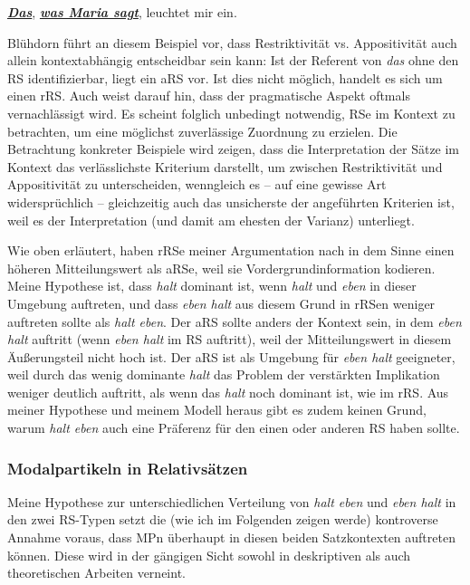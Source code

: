 \begin{exe}
	\ex\label{731} 
	\ul{\textit{\textbf{Das}}}, \ul{\textbf{\textit{was Maria sagt}}}, leuchtet mir ein.
	\hfill\hbox{\citet[27]{Bluehdorn2007}}
\end{exe}										           
Blühdorn führt an diesem Beispiel vor, dass Restriktivität vs. Appositivität auch allein kontextabhängig entscheidbar sein kann: Ist der Referent von \textit{das} ohne den RS identifizierbar, liegt ein aRS vor. Ist dies nicht möglich, handelt es sich um einen rRS. Auch \citet[193--194]{Schaffranietz1997} weist darauf hin, dass der pragmatische Aspekt oftmals vernachlässigt wird. Es scheint folglich unbedingt notwen\-dig, RSe im Kontext zu betrachten, um eine möglichst zuverlässige Zuordnung zu erzielen. Die Betrachtung konkreter Beispiele wird zeigen, dass die Interpretation der Sätze im Kontext das verlässlichste Kriterium darstellt, um zwischen Restriktivität und Appositivität zu unterscheiden, wenngleich es – auf eine gewisse Art widersprüchlich – gleichzeitig auch das unsicherste der angeführten Kriterien ist, weil es der Interpretation (und damit am ehesten der Varianz) unterliegt.

Wie oben erläutert, haben rRSe meiner Argumentation nach in dem Sinne einen höheren Mitteilungswert als aRSe, weil sie Vordergrundinformation kodie\-ren. Meine Hypothese ist, dass \textit{halt} dominant ist, wenn \textit{halt} und \textit{eben} in dieser Umgebung auftreten, und dass \textit{eben halt} aus diesem Grund in rRSen weniger auftreten sollte als \textit{halt eben}. Der aRS sollte anders der Kontext sein, in dem \textit{eben halt} auftritt (wenn \textit{eben halt} im RS auftritt), weil der Mitteilungswert in diesem Äußerungsteil nicht hoch ist. Der aRS ist als Umgebung für \textit{eben halt} geeigneter, weil durch das wenig dominante \textit{halt} das Problem der verstärkten Implikation weniger deutlich auftritt, als wenn das \textit{halt} noch dominant ist, wie im rRS. Aus meiner Hypothese und meinem Modell heraus gibt es zudem keinen Grund, warum \textit{halt eben} auch eine Präferenz für den einen oder anderen RS haben sollte.

\subsubsection{Modalpartikeln in Relativsätzen} 
\label{sec:mpnrs}
Meine Hypothese zur unterschiedlichen Verteilung von \textit{halt eben} und \textit{eben halt} in den zwei RS-Typen setzt die (wie ich im Folgenden zeigen werde) kontroverse Annahme voraus, dass MPn überhaupt in diesen beiden Satzkontexten auftreten können. Diese wird in der gängigen Sicht sowohl in deskriptiven als auch theoretischen Arbeiten verneint.


